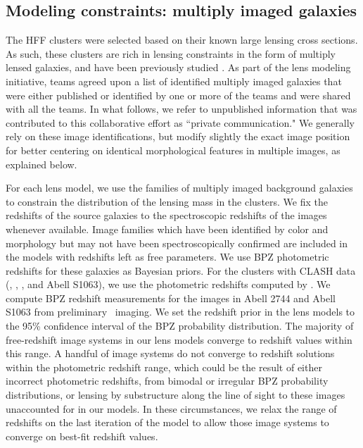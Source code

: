 \subsection{Modeling constraints: multiply imaged galaxies}

The HFF clusters were selected based on their known large lensing cross sections. As such, these clusters are rich in lensing constraints in the form of multiply lensed galaxies, and have been previously studied \citep{Zitrin:2013lr,Zheng:2012fk,Limousin:2012fj,Merten:2011fk,Zitrin:2011qy,Richard:2010wd,Smith:2009lr,Zitrin:2009qy,Zitrin:2009kx}. As part of the lens modeling initiative, teams agreed upon a list of identified multiply imaged galaxies that were either published or identified by one or more of the teams and were shared with all the teams. In what follows, we refer to unpublished information that was contributed to this collaborative effort as ``private communication." We generally rely on these image identifications, but modify slightly the exact image position for better centering on identical morphological features in multiple images, as explained below. 

For each lens model, we use the families of multiply imaged background galaxies to constrain the distribution of the lensing mass in the clusters. We fix the redshifts of the source galaxies to the spectroscopic redshifts of the images whenever available. Image families which have been identified by color and morphology but may not have been spectroscopically confirmed are included in the models with redshifts left as free parameters. We use BPZ photometric redshifts for these galaxies as Bayesian priors. For the clusters with CLASH data (\MACSzerofour, \MACSzeroseven, \MACSeleven, and Abell S1063), we use the photometric redshifts computed by \citet{Jouvel:2014qy}. We compute BPZ redshift measurements for the images in Abell 2744 and Abell S1063 from preliminary \hst\ imaging. We set the redshift prior in the lens models to the 95\% confidence interval of the BPZ probability distribution. The majority of free-redshift image systems in our lens models converge to redshift values within this range. A handful of image systems do not converge to redshift solutions within the photometric redshift range, which could be the result of either incorrect photometric redshifts, from bimodal or irregular BPZ probability distributions, or lensing by substructure along the line of sight to these images unaccounted for in our models. In these circumstances, we relax the range of redshifts on the last iteration of the model to allow those image systems to converge on best-fit redshift values. 

